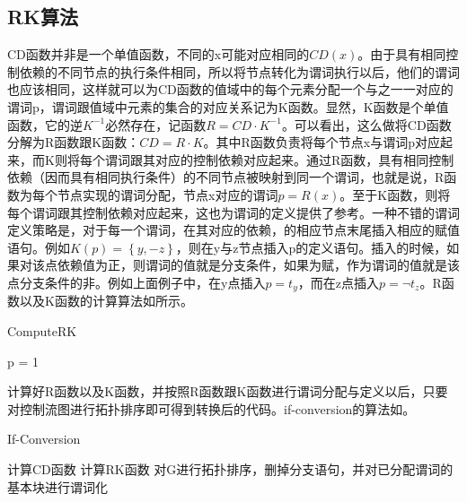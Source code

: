 \subsection{RK算法}

CD函数并非是一个单值函数，不同的x可能对应相同的$CD\left(x\right)$。由于具有相同控制依赖的不同节点的执行条件相同，所以将节点转化为谓词执行以后，他们的谓词也应该相同，这样就可以为CD函数的值域中的每个元素分配一个与之一一对应的谓词p，谓词跟值域中元素的集合的对应关系记为K函数。显然，K函数是个单值函数，它的逆$K^{-1}$必然存在，记函数$R=CD\cdot K^{-1}$。可以看出，这么做将CD函数分解为R函数跟K函数：$CD=R\cdot K$。其中R函数负责将每个节点x与谓词p对应起来，而K则将每个谓词跟其对应的控制依赖对应起来。通过R函数，具有相同控制依赖（因而具有相同执行条件）的不同节点被映射到同一个谓词，也就是说，R函数为每个节点实现的谓词分配，节点x对应的谓词$p=R\left(x\right)$。至于K函数，则将每个谓词跟其控制依赖对应起来，这也为谓词的定义提供了参考。一种不错的谓词定义策略是，对于每一个谓词，在其对应的依赖，的相应节点末尾插入相应的赋值语句。例如$K\left(p\right)=\left\{y,-z\right\}$，则在y与z节点插入p的定义语句。插入的时候，如果对该点依赖值为正，则谓词的值就是分支条件，如果为赋，作为谓词的值就是该点分支条件的非。例如上面例子中，在y点插入$p=t_y$，而在z点插入$p=\neg t_z$。R函数以及K函数的计算算法如所示。

\begin{algorithm}[H]
	\label{alg:ComputeRK}
	\caption{ComputeRK}
	p = 1
\end{algorithm}
计算好R函数以及K函数，并按照R函数跟K函数进行谓词分配与定义以后，只要对控制流图进行拓扑排序即可得到转换后的代码。if-conversion的算法如。

\begin{algorithm}[H]
	\label{alg:ifcvt}
	\caption{If-Conversion}
	计算CD函数\;
	计算RK函数\;
	对G进行拓扑排序，删掉分支语句，并对已分配谓词的基本块进行谓词化\;
\end{algorithm}

